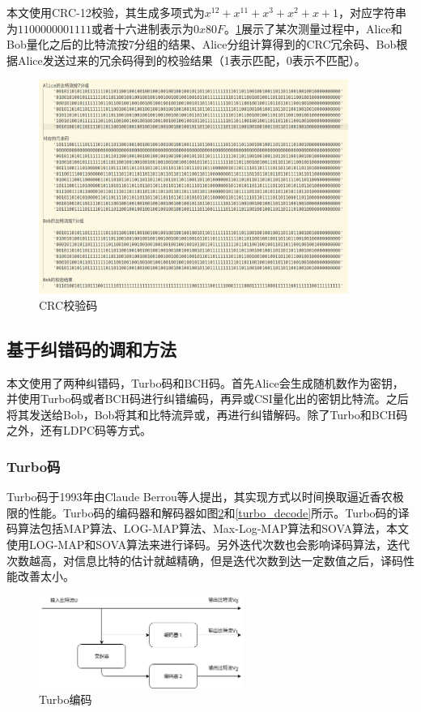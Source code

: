 本文使用CRC-12校验，其生成多项式为$x^{12}+x^{11}+x^{3}+x^{2}+x+1$，对应字符串为$1100000001111$或者十六进制表示为$0x80F$。\ref{bitstream_and_crccode}展示了某次测量过程中，Alice和Bob量化之后的比特流按7分组的结果、Alice分组计算得到的CRC冗余码、Bob根据Alice发送过来的冗余码得到的校验结果（1表示匹配，0表示不匹配）。

\begin{figure}[htbp!]
    \centering \includegraphics[width=0.9\textwidth]{images/bitstream_and_crccode} 
    \caption{CRC校验码}
    \label{bitstream_and_crccode}
\end{figure}

\subsection{基于纠错码的调和方法}

本文使用了两种纠错码，Turbo码和BCH码。首先Alice会生成随机数作为密钥，并使用Turbo码或者BCH码进行纠错编码，再异或CSI量化出的密钥比特流。之后将其发送给Bob，Bob将其和比特流异或，再进行纠错解码。除了Turbo和BCH码之外，还有LDPC码等方式。

\subsubsection{Turbo码}

Turbo码于1993年由Claude Berrou等人提出，其实现方式以时间换取逼近香农极限的性能。Turbo码的编码器和解码器如图\ref{turbo_encode}和\ref{turbo_decode}所示。Turbo码的译码算法包括MAP算法、LOG-MAP算法、Max-Log-MAP算法和SOVA算法，本文使用LOG-MAP和SOVA算法来进行译码。另外迭代次数也会影响译码算法，迭代次数越高，对信息比特的估计就越精确，但是迭代次数到达一定数值之后，译码性能改善太小。

\begin{figure}[htbp!]
    \centering \includegraphics[width=0.6\textwidth]{images/turbo_encode} 
    \caption{Turbo编码}
    \label{turbo_encode}
\end{figure}

